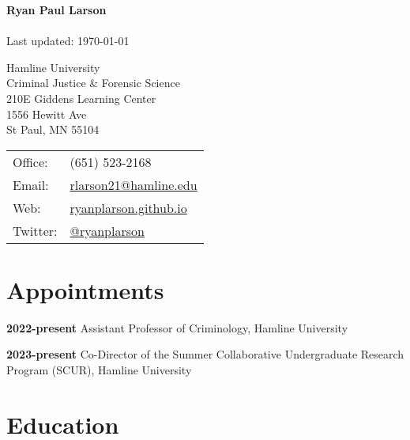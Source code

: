 \documentclass[letterpaper]{article}
\def\name{Ryan Paul Larson}
\newenvironment{publist}{%
  \begin{list}{}{%
    \setlength{\leftmargin}{0cm}   %
    \setlength{\labelwidth}{2cm}     %
    \setlength{\labelsep}{0.5cm}     %
  }%
}{%
  \end{list}%
}
\begin{document}
\textbf{{\huge \name}}\\
\\
Last updated: \today

\vspace{5ex}





\begin{minipage}{0.45\linewidth}
  Hamline University \\
  Criminal Justice \& Forensic Science \\
  210E Giddens Learning Center \\
 1556 Hewitt Ave \\
 St Paul, MN 55104
\end{minipage}
\begin{minipage}{0.45\linewidth}
  \begin{tabular}{ll}
    Office: & (651) 523-2168 \\
    Email: & \href{mailto:rlarson21@hamline.edu}{rlarson21@hamline.edu} \\
    Web: & \href{https://ryanplarson.github.io/personal_site/}{ryanplarson.github.io} \\
   Twitter: &  \href{https://twitter.com/ryanplarson}{@ryanplarson} \\
  \end{tabular}
\end{minipage}



\section*{\textbf{Appointments}}


\begin{publist}

\item[\textbf{2022-present}] Assistant Professor of Criminology, Hamline University

\item[\textbf{2023-present}] Co-Director of the Summer Collaborative Undergraduate Research Program (SCUR), Hamline University


\end{publist}



\section*{\textbf{Education}}
\end{document}
